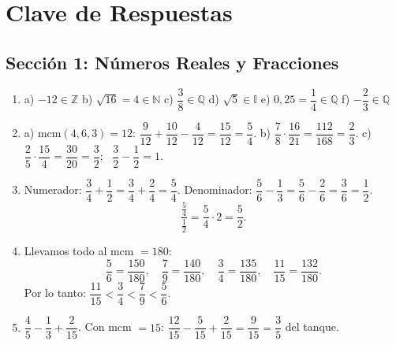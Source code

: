 \documentclass[12pt, letterpaper]{article}
\newcommand{\N}{\mathbb{N}}
\newcommand{\Z}{\mathbb{Z}}
\newcommand{\Q}{\mathbb{Q}}
\newcommand{\I}{\mathbb{I}}
\begin{document}
\newpage

\ifmwclaves
  \section{Clave de Respuestas}

  \subsection*{Sección 1: Números Reales y Fracciones}

  \begin{enumerate}[leftmargin=*, label=\textbf{\arabic*.}]
    \item a) $-12 \in \Z$ \quad b) $\sqrt{16} = 4 \in \N$ \quad c) $\dfrac{3}{8} \in \Q$ \quad d) $\sqrt{5} \in \I$ \quad e) $0{,}25 = \dfrac{1}{4} \in \Q$ \quad f) $-\dfrac{2}{3} \in \Q$

    \item a) mcm$(4,6,3) = 12$: $\dfrac{9}{12} + \dfrac{10}{12} - \dfrac{4}{12} = \dfrac{15}{12} = \dfrac{5}{4}$.
          \quad b) $\dfrac{7}{8} \cdot \dfrac{16}{21} = \dfrac{112}{168} = \dfrac{2}{3}$.
          \quad c) $\dfrac{2}{5} \cdot \dfrac{15}{4} = \dfrac{30}{20} = \dfrac{3}{2}$; \ $\dfrac{3}{2} - \dfrac{1}{2} = 1$.

    \item Numerador: $\dfrac{3}{4} + \dfrac{1}{2} = \dfrac{3}{4} + \dfrac{2}{4} = \dfrac{5}{4}$. \quad
          Denominador: $\dfrac{5}{6} - \dfrac{1}{3} = \dfrac{5}{6} - \dfrac{2}{6} = \dfrac{3}{6} = \dfrac{1}{2}$.
          \[
            \frac{\frac{5}{4}}{\frac{1}{2}} = \frac{5}{4} \cdot 2 = \frac{5}{2}.
          \]

    \item Llevamos todo al mcm $= 180$:
          \[
            \frac{5}{6} = \frac{150}{180}, \quad \frac{7}{9} = \frac{140}{180}, \quad \frac{3}{4} = \frac{135}{180}, \quad \frac{11}{15} = \frac{132}{180}.
          \]
          Por lo tanto: $\dfrac{11}{15} < \dfrac{3}{4} < \dfrac{7}{9} < \dfrac{5}{6}$.

    \item $\dfrac{4}{5} - \dfrac{1}{3} + \dfrac{2}{15}$. Con mcm $= 15$: $\dfrac{12}{15} - \dfrac{5}{15} + \dfrac{2}{15} = \dfrac{9}{15} = \dfrac{3}{5}$ del tanque.
  \end{enumerate}

  \newpage
\end{document}
